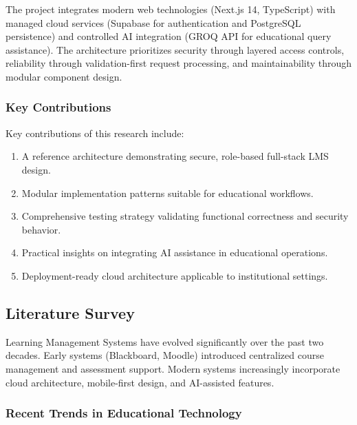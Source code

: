 \documentclass[11pt,a4paper]{article}
\begin{document}
The project integrates modern web technologies (Next.js 14, TypeScript) with managed cloud services (Supabase for authentication and PostgreSQL persistence) and controlled AI integration (GROQ API for educational query assistance). The architecture prioritizes security through layered access controls, reliability through validation-first request processing, and maintainability through modular component design.

\subsubsection{Key Contributions}

Key contributions of this research include:

\begin{enumerate}
    \item A reference architecture demonstrating secure, role-based full-stack LMS design.
    \item Modular implementation patterns suitable for educational workflows.
    \item Comprehensive testing strategy validating functional correctness and security behavior.
    \item Practical insights on integrating AI assistance in educational operations.
    \item Deployment-ready cloud architecture applicable to institutional settings.
\end{enumerate}

\subsection{Literature Survey}

Learning Management Systems have evolved significantly over the past two decades. Early systems (Blackboard, Moodle) introduced centralized course management and assessment support. Modern systems increasingly incorporate cloud architecture, mobile-first design, and AI-assisted features.

\subsubsection{Recent Trends in Educational Technology}
\end{document}
